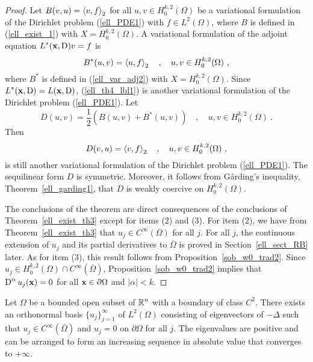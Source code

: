 \begin{proof}
Let $\displaystyle B(v,u) = \left\langle{v} , {f}\right\rangle_2$ for all
$\displaystyle u, v \in H^{k,2}_0(\Omega)$
be a variational formulation of the Dirichlet problem (\ref{ell_PDE1})
with $\displaystyle f\in L^2(\Omega)$, where $B$ is defined in
(\ref{ell_exist_1}) with $\displaystyle X=H^{k,2}_0(\Omega)$.  A
variational formulation of the adjoint equation
$\displaystyle L^\ast(\mathbf{x},\operatorname{D})v = f$ is
\begin{equation} \label{ell_th4_lbl1}
B^\ast(u,v) = \ps{u}{f}_2 \quad , \quad u,v \in H^{k,2}_0(\Omega) \ ,
\end{equation}
where $\displaystyle B^\ast$ is defined in (\ref{ell_var_adj2}) with
$\displaystyle X=H^{k,2}_0(\Omega)$. Since
$\displaystyle L^\ast(\mathbf{x},\operatorname{D})=L(\mathbf{x},\operatorname{D})$,
(\ref{ell_th4_lbl1}) is another variational formulation of the
Dirichlet problem (\ref{ell_PDE1}).  Let
\[
D(u,v) = \frac{1}{2} \left( B(u,v) + B^\ast(u,v) \right)
\quad , \quad u,v \in H^{k,2}_0(\Omega) \ .
\]
Then
\[
D(v,u) = \left\langle{v} , {f}\right\rangle_2 \quad , \quad u,v \in H^{k,2}_0(\Omega) \ ,
\]
is still another variational formulation of the Dirichlet problem
(\ref{ell_PDE1}).  The sequilinear form $D$ is symmetric.  Moreover, 
it follows from G\r{a}rding's inequality,
Theorem~\ref{ell_garding1}, that $D$ is weakly coercive on
$\displaystyle H^{k,2}_0(\Omega)$.

The conclusions of the theorem are direct consequences of the
conclusions of Theorem~\ref{ell_exist_th3} except for items
(2) and (3).  For item (2), we have from
Theorem~\ref{ell_exist_th3} that
$\displaystyle u_j \in C^\infty(\Omega)$ for all $j$.
For all $j$, the continuous extension of $u_j$ and its partial
derivatives to $\overline{\Omega}$ is proved in
Section~\ref{ell_sect_RB} later.  As for item (3), this result
follows from Proposition~\ref{sob_w0_trad2}.
Since $\displaystyle u_j \in H^{k,2}_0(\Omega) \cap C^\infty(\overline{\Omega})$,
Proposition~\ref{sob_w0_trad2} implies that
$\displaystyle \operatorname{D}^\alpha u_j(\mathbf{x}) = 0$ for all
$\mathbf{x} \in \partial \Omega$ and $|\alpha|<k$. 
\end{proof}

\begin{cor}
Let $\Omega$ be a bounded open subset of $\displaystyle \mathbb{R}^n$ with a
boundary of class $\displaystyle C^2$.  There exists an
orthonormal basis $\displaystyle \{u_j\}_{j=1}^\infty$ of
$\displaystyle L^2(\Omega)$ consisting
of eigenvectors of $-\Delta$ such that
$\displaystyle u_j \in C^\infty(\overline{\Omega})$ and
$u_j=0$ on $\partial \Omega$ for all $j$.  The eigenvalues are
positive and can be arranged to form an increasing sequence in
absolute value that converges to $+\infty$.
\end{cor}


